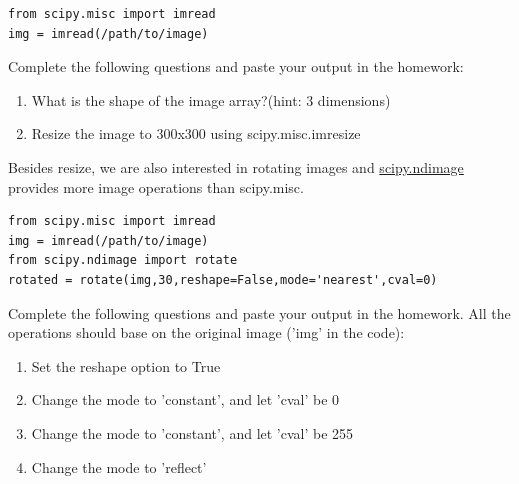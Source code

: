 \documentclass[12pt]{article}%
\begin{document}
\begin{verbatim}
from scipy.misc import imread 
img = imread(/path/to/image)
\end{verbatim}
Complete the following questions and paste your output in the homework:
\begin{enumerate}
\item What is the shape of the image array?(hint: 3 dimensions)
\item Resize the image to 300x300 using scipy.misc.imresize
\end{enumerate}
Besides resize, we are also interested in rotating images and \href{https://docs.scipy.org/doc/scipy-0.19.1/reference/ndimage.html}{scipy.ndimage} provides more image operations than scipy.misc.
\begin{verbatim}
from scipy.misc import imread 
img = imread(/path/to/image)
from scipy.ndimage import rotate 
rotated = rotate(img,30,reshape=False,mode='nearest',cval=0)
\end{verbatim}
Complete the following questions and paste your output in the homework. All the operations should base on the original image ('img' in the code):
\begin{enumerate}
\item Set the reshape option to True
\item Change the mode to 'constant', and let 'cval' be 0 
\item Change the mode to 'constant', and let 'cval' be 255
\item Change the mode to 'reflect'
\end{enumerate}
\vspace{30mm}
\end{document}
